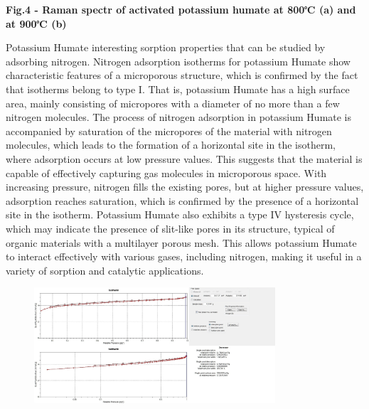 {\bfseries Fig.4 - Raman spectr of activated potassium humate at 800℃ (a)
and at 900℃ (b)}

Potassium Humate interesting sorption properties that can be studied by
adsorbing nitrogen. Nitrogen adsorption isotherms for potassium Humate
show characteristic features of a microporous structure, which is
confirmed by the fact that isotherms belong to type I. That is,
potassium Humate has a high surface area, mainly consisting of
micropores with a diameter of no more than a few nitrogen molecules. The
process of nitrogen adsorption in potassium Humate is accompanied by
saturation of the micropores of the material with nitrogen molecules,
which leads to the formation of a horizontal site in the isotherm, where
adsorption occurs at low pressure values. This suggests that the
material is capable of effectively capturing gas molecules in
microporous space. With increasing pressure, nitrogen fills the existing
pores, but at higher pressure values, adsorption reaches saturation,
which is confirmed by the presence of a horizontal site in the isotherm.
Potassium Humate also exhibits a type IV hysteresis cycle, which may
indicate the presence of slit-like pores in its structure, typical of
organic materials with a multilayer porous mesh. This allows potassium
Humate to interact effectively with various gases, including nitrogen,
making it useful in a variety of sorption and catalytic applications.

\begin{figure}[H]
	\centering
	\includegraphics[width=0.8\textwidth]{media/chem2/image103}
	\caption*{}
\end{figure}

